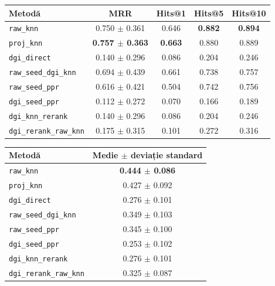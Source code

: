 \documentclass[12pt]{article}
\numberwithin{equation}{section}
\numberwithin{figure}{section}
\numberwithin{table}{section}
\theoremstyle{definition}
\theoremstyle{plain}
\begin{document}
\vspace{-0.75em}
\begin{flushleft}
\small
\setlength{\tabcolsep}{4pt}
\renewcommand{\arraystretch}{0.95}
\captionsetup{type=table,hypcap=false,justification=raggedright,singlelinecheck=false}
\caption{Evaluarea extrinsecă: metrici de ranking MRR și Hits@k}
\label{tab:extrinsic-ranking-metrics}
\begin{tabular}{lcccc}
\toprule
\textbf{Metodă} & \textbf{MRR} & \textbf{Hits@1} & \textbf{Hits@5} & \textbf{Hits@10} \\
\midrule
\texttt{raw\_knn} & 0.750 $\pm$ 0.361 & 0.646 & \textbf{0.882} & \textbf{0.894} \\
\texttt{proj\_knn} & \textbf{0.757 $\pm$ 0.363} & \textbf{0.663} & 0.880 & 0.889 \\
\texttt{dgi\_direct} & 0.140 $\pm$ 0.296 & 0.086 & 0.204 & 0.246 \\
\texttt{raw\_seed\_dgi\_knn} & 0.694 $\pm$ 0.439 & 0.661 & 0.738 & 0.757 \\
\texttt{raw\_seed\_ppr} & 0.616 $\pm$ 0.421 & 0.504 & 0.742 & 0.756 \\
\texttt{dgi\_seed\_ppr} & 0.112 $\pm$ 0.272 & 0.070 & 0.166 & 0.189 \\
\texttt{dgi\_knn\_rerank} & 0.140 $\pm$ 0.296 & 0.086 & 0.204 & 0.246 \\
\texttt{dgi\_rerank\_raw\_knn} & 0.175 $\pm$ 0.315 & 0.101 & 0.272 & 0.316 \\
\bottomrule
\end{tabular}
\end{flushleft}

\vspace{-0.75em}
\begin{flushleft}
\small
\setlength{\tabcolsep}{5pt}
\renewcommand{\arraystretch}{0.95}
\captionsetup{type=table,hypcap=false,justification=raggedright,singlelinecheck=false}
\caption{Evaluarea extrinsecă: relevanța semantică medie față de interogare, calculată prin similaritate cosinus în spațiul UniXcoder brut}
\label{tab:extrinsic-semantic-relevance}
\begin{tabular}{lc}
\toprule
\textbf{Metodă} & \textbf{Medie $\pm$ deviație standard} \\
\midrule
\texttt{raw\_knn} & \textbf{0.444 $\pm$ 0.086} \\
\texttt{proj\_knn} & 0.427 $\pm$ 0.092 \\
\texttt{dgi\_direct} & 0.276 $\pm$ 0.101 \\
\texttt{raw\_seed\_dgi\_knn} & 0.349 $\pm$ 0.103 \\
\texttt{raw\_seed\_ppr} & 0.345 $\pm$ 0.100 \\
\texttt{dgi\_seed\_ppr} & 0.253 $\pm$ 0.102 \\
\texttt{dgi\_knn\_rerank} & 0.276 $\pm$ 0.101 \\
\texttt{dgi\_rerank\_raw\_knn} & 0.325 $\pm$ 0.087 \\
\bottomrule
\end{tabular}
\end{flushleft}
\end{document}
